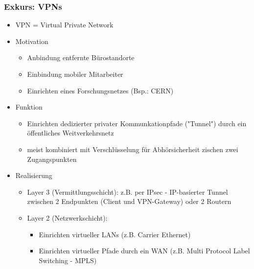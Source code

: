 \subsubsection{Exkurs: VPNs}
\begin{itemize}
	\item VPN = Virtual Private Network
	\item Motivation
	\begin{itemize}
		\item Anbindung entfernte Bürostandorte
		\item Einbindung mobiler Mitarbeiter
		\item Einrichten eines Forschungsnetzes (Bsp.: CERN)
	\end{itemize}
	\item Funktion 
	\begin{itemize}
		\item Einrichten dedizierter privater Kommunkationpfade ("Tunnel") durch ein öffentliches Weitverkehrsnetz
		\item meist kombiniert mit Verschlüsselung für Abhörsicherheit zischen zwei Zugangspunkten
	\end{itemize}
	\item Realisierung
	\begin{itemize}
		\item Layer 3 (Vermittlungsschicht): z.B. per IPsec - IP-basierter Tunnel zwischen 2 Endpunkten (Client und VPN-Gateway) oder 2 Routern
		\item Layer 2 (Netzwerkschicht):
		\begin{itemize}
			\item Einrichten virtueller LANs (z.B. Carrier Ethernet)
			\item Einrichten virtueller Pfade durch ein WAN (z.B. Multi Protocol Label Switching - MPLS)
		\end{itemize}
	\end{itemize}
\end{itemize}
